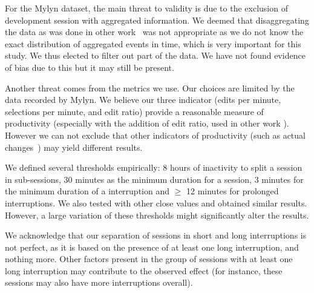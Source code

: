 \documentclass[times]{smrauth}
\begin{document}
For the Mylyn dataset, the main threat to validity is due to the exclusion of development session with aggregated information. We deemed that disaggregating the data as was done in other work~\cite{YR11}  was not appropriate as we do not know the exact distribution of aggregated events in time, which is very important for this study. We thus elected to filter out part of the data. We have not found evidence of bias due to this but it may still be present.

Another threat comes from the metrics we use. Our choices are limited by the data recorded by Mylyn. We believe our three indicator (edits per minute, selections per minute, and edit ratio) provide a reasonable measure of productivity (especially with the addition of edit ratio, used in other work \cite{KM06}). However we can not exclude that other indicators of productivity (such as actual changes~\cite{RL10}) may yield different results.

We defined several thresholds empirically: 8 hours of inactivity to split a session in sub-sessions, 30 minutes as the minimum duration for a session, 3 minutes for the minimum duration of a interruption and  $\geq$ 12 minutes for prolonged interruptions. We also tested with other close values and obtained similar results. However, a large variation of these thresholds might significantly alter the results. 

We acknowledge that our separation of sessions in short and long interruptions is not perfect, as it is based on the presence of at least one long interruption, and nothing more. Other factors present in the group of sessions with at least one long interruption may contribute to the observed effect (for instance, these sessions may also have more interruptions overall).


\end{document}
